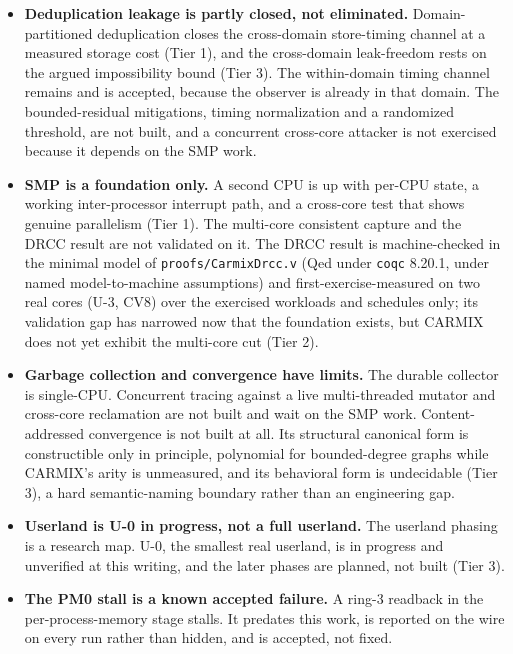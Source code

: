 \documentclass[10pt,twocolumn]{article}
\newcommand{\carmix}{CARMIX}
\begin{document}
\begin{itemize}
deficit growth and recovers the progress rate but does not refund the penalty
already paid, and it accounts for one peer rather than many. It is a first measured
control, not a proven-optimal fairness algorithm.
\item \textbf{Deduplication leakage is partly closed, not eliminated.}
Domain-partitioned deduplication closes the cross-domain store-timing channel at a
measured storage cost (Tier 1), and the cross-domain leak-freedom rests on the
argued impossibility bound (Tier 3). The within-domain timing channel remains and
is accepted, because the observer is already in that domain. The bounded-residual
mitigations, timing normalization and a randomized threshold, are not built, and a
concurrent cross-core attacker is not exercised because it depends on the SMP work.
\item \textbf{SMP is a foundation only.} A second CPU is up with per-CPU state, a
working inter-processor interrupt path, and a cross-core test that shows genuine
parallelism (Tier 1). The multi-core consistent capture and the DRCC result are
not validated on it. The DRCC result is machine-checked in the minimal model of
\texttt{proofs/CarmixDrcc.v} (Qed under \texttt{coqc} 8.20.1, under named
model-to-machine assumptions) and first-exercise-measured on two real cores (U-3,
CV8) over the exercised workloads and schedules only; its validation gap has
narrowed now that the foundation exists, but \carmix{} does not yet exhibit the
multi-core cut (Tier 2).
\item \textbf{Garbage collection and convergence have limits.} The durable
collector is single-CPU. Concurrent tracing against a live multi-threaded mutator
and cross-core reclamation are not built and wait on the SMP work.
Content-addressed convergence is not built at all. Its structural canonical form is
constructible only in principle, polynomial for bounded-degree graphs while
\carmix{}'s arity is unmeasured, and its behavioral form is undecidable (Tier 3),
a hard semantic-naming boundary rather than an engineering gap.
\item \textbf{Userland is U-0 in progress, not a full userland.} The userland
phasing is a research map. U-0, the smallest real userland, is in progress and
unverified at this writing, and the later phases are planned, not built (Tier 3).
\item \textbf{The PM0 stall is a known accepted failure.} A ring-3 readback in the
per-process-memory stage stalls. It predates this work, is reported on the wire on
every run rather than hidden, and is accepted, not fixed.

\end{itemize}
\end{document}
